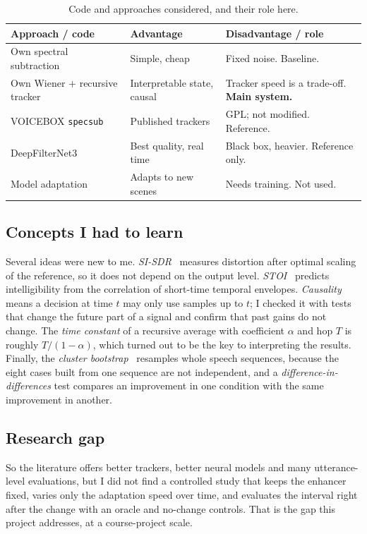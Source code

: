 \documentclass[10pt,conference,a4paper]{IEEEtran}
\begin{document}
\begin{table}[t]
\centering
\caption{Code and approaches considered, and their role here.}
\label{tab:approaches}
\footnotesize
\begin{tabular}{@{}p{2.2cm}p{2.7cm}p{2.6cm}@{}}
\toprule
Approach / code & Advantage & Disadvantage / role\\
\midrule
Own spectral subtraction~\cite{boll1979spectral} & Simple, cheap & Fixed noise. Baseline.\\
Own Wiener + recursive tracker~\cite{scalart1996apriori} & Interpretable state, causal & Tracker speed is a trade-off. \textbf{Main system.}\\
VOICEBOX \texttt{specsub}~\cite{brookes_voicebox} & Published trackers~\cite{martin2001noise,gerkmann2012unbiased} & GPL; not modified. Reference.\\
DeepFilterNet3~\cite{schroter2023deepfilternet} & Best quality, real time & Black box, heavier. Reference only.\\
Model adaptation~\cite{cheng2026lightweight} & Adapts to new scenes & Needs training. Not used.\\
\bottomrule
\end{tabular}
\end{table}

\subsection{Concepts I had to learn}
Several ideas were new to me. \emph{SI-SDR}~\cite{leroux2019sdr} measures
distortion after optimal scaling of the reference, so it does not depend on the
output level. \emph{STOI}~\cite{taal2011stoi} predicts intelligibility from the
correlation of short-time temporal envelopes. \emph{Causality} means a decision
at time $t$ may only use samples up to $t$; I checked it with tests that change
the future part of a signal and confirm that past gains do not change. The
\emph{time constant} of a recursive average with coefficient $\alpha$ and hop
$T$ is roughly $T/(1-\alpha)$, which turned out to be the key to interpreting
the results. Finally, the \emph{cluster bootstrap}~\cite{efron1993bootstrap}
resamples whole speech sequences, because the eight cases built from one
sequence are not independent, and a \emph{difference-in-differences} test
compares an improvement in one condition with the same improvement in another.

\subsection{Research gap}
So the literature offers better trackers, better neural models and many
utterance-level evaluations, but I did not find a controlled study that keeps the
enhancer fixed, varies only the adaptation speed over time, and evaluates the
interval right after the change with an oracle and no-change controls. That is
the gap this project addresses, at a course-project scale.
\end{document}
